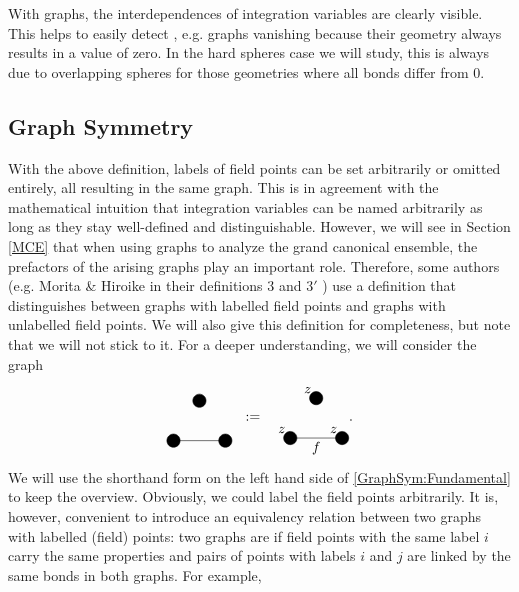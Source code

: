 \documentclass[8.5pt,twoside,twocolumn]{article}
\theoremstyle{standard}
\begin{document}
With graphs, the interdependences of integration variables are clearly visible.
This helps to easily detect , e.g. graphs vanishing
because their geometry always results in a value of zero. In the hard spheres case
we will study, this is always due to overlapping spheres for those geometries
where all bonds differ from 0.

\subsection{Graph Symmetry}
\label{GraphSym}

With the above definition, labels of field points can be set arbitrarily or omitted entirely,
all resulting in the same graph. This is in agreement with the mathematical intuition that
integration variables can be named arbitrarily as long as they stay well-defined and
distinguishable. However, we will see in Section \ref{MCE} that when using graphs to
analyze the grand canonical ensemble, the prefactors of the arising graphs play an important
role. Therefore, some authors (e.g. Morita \& Hiroike in their definitions $3$ and $3'$ \cite{Hiroike})
use a definition that distinguishes between graphs with labelled field points and graphs with unlabelled
field points. We will also give this definition for completeness, but note that we will not stick to it.
For a deeper understanding, we will consider the graph
\begin{equation}
\begin{tikzpicture}[baseline={(current bounding box.center)}]
  \draw(0,0) node[circle,minimum size=.2cm,draw,fill=black] (A) {};
  \draw(1.3,0) node[circle,minimum size=.2cm,draw,fill=black] (B) {};
  \draw(.65,1) node[circle,minimum size=.2cm,draw,fill=black] (C) {};
  \draw (A.center) --  (B.center);
\end{tikzpicture} \ \ :=\ \ 
\begin{tikzpicture}[baseline={(current bounding box.center)}]
  \draw(0,0) node[circle,minimum size=.2cm,draw,fill=black] (A) {};
  \draw(1.3,0) node[circle,minimum size=.2cm,draw,fill=black] (B) {};
  \draw(.65,1) node[circle,minimum size=.2cm,draw,fill=black] (C) {};
  \draw (A.center) --  (B.center);
  \node at (.65,-.25) {$f$};
  \node [above left] at (A) {$z$};
  \node [above left] at (B) {$z$};
  \node [above left] at (C) {$z$};
\end{tikzpicture}.
\label{GraphSym:Fundamental}
\end{equation}
We will use the shorthand form on the left hand side of \eqref{GraphSym:Fundamental} to
keep the overview. Obviously, we could label the field points arbitrarily. It is, however, 
convenient to introduce an equivalency relation between
two graphs with labelled (field) points: two graphs are 
if field points with the same label $i$ carry the same properties and pairs of points with
labels $i$ and $j$ are linked by the same bonds in both graphs. For example,
\end{document}
